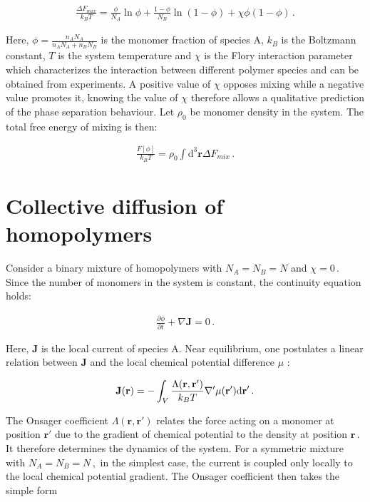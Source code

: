 \documentclass[bachelor,       %
               twoside,        %
               BCOR10mm,       %
                ngerman,english  %
               ]{GAUBM}
\begin{document}
\begin{align}
  \frac{\Delta F_{mix}}{k_BT}=\frac{\phi}{N_A}\ln\phi+\frac{1-\phi}{N_B}\ln(1-\phi)+\chi\phi(1-\phi)\,.
\end{align}

Here, $\phi=\frac{n_AN_A}{n_AN_A+n_BN_B}$ is the monomer fraction of species A, $k_B$ is the Boltzmann constant, $T$ is the system temperature and $\chi$ is the Flory interaction parameter which characterizes the interaction between different polymer species and can be obtained from experiments. A positive value of $\chi$ opposes mixing while a negative value promotes it, knowing the value of $\chi$ therefore allows a qualitative prediction of the phase separation behaviour. Let $\rho_0$ be monomer density in the system. The total free energy of mixing is then:

\begin{align}
  \frac{F[\phi]}{k_BT}=\rho_0\int \mathrm{d}^3\mathbf{r}\Delta F_{mix}\,.
\end{align}

\section{Collective diffusion of homopolymers}

Consider a binary mixture of homopolymers with $N_A=N_B=N$ and $\chi=0\,.$ Since the number of monomers in the system is constant, the continuity equation holds:

\begin{align}
  \frac{\partial\phi}{\partial t}+\nabla\mathbf{J}=0\,.
\end{align}

Here, $\mathbf{J}$ is the local current of species A. Near equilibrium, one postulates a linear relation between $\mathbf J$ and the local chemical potential difference $\mu$ \cite{deGennes80}:


\begin{align}
    \mathbf J(\mathbf{r})=-\int_V\frac{\Lambda(\mathbf{r}, \mathbf{r'})}{k_BT}\nabla '\mu(\mathbf{r'})\text d \mathbf{r'}\,.
\end{align}

The Onsager coefficient $\Lambda(\mathbf{r}, \mathbf{r'})$ relates the force acting on a monomer at position $\mathbf{r'}$ due to the gradient of chemical potential to the density at position $\mathbf{r}\,$. It therefore determines the dynamics of the system. For a symmetric mixture with $N_A=N_B=N\,,$ in the simplest case, the current is coupled only locally to the local chemical potential gradient. The Onsager coefficient then takes the simple form \cite{deGennes80, Binder83}
\end{document}
